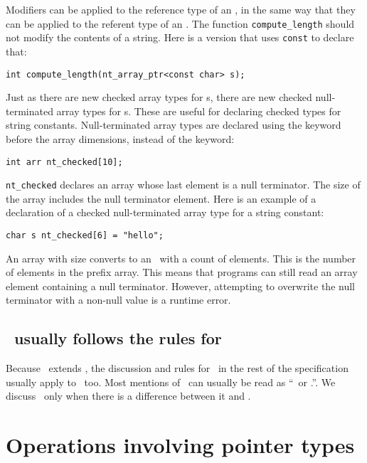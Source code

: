 Modifiers can be applied to the reference type of
an \ntarrayptr, in the same way that they can be applied to the
referent type of an \arrayptr.
The function \verb+compute_length+
should not modify the contents of a string. Here
is a version that uses \verb+const+ to declare that:
\begin{verbatim}
int compute_length(nt_array_ptr<const char> s);
\end{verbatim}

Just as there are new checked array types for \arrayptr s,
there are new checked null-terminated array types for \ntarrayptr s.
These are useful for declaring  checked types for string constants.
Null-terminated array types are declared using the
 keyword before the array dimensions,
instead of the  keyword:
\begin{verbatim}
int arr nt_checked[10];
\end{verbatim}
\verb+nt_checked+ declares an array whose
last element is a null terminator.  The size of the
array includes the null terminator element.
Here is an example of a declaration of a checked null-terminated
array type for a string constant:
\begin{verbatim}
char s nt_checked[6] = "hello";
\end{verbatim}

An  array with size  converts
to an \ntarrayptr\ with a count of  elements.
This is the number of elements in the prefix array.   This means that
programs can still read an array element containing a null terminator.
However, attempting to overwrite the null terminator with a non-null
value is a runtime error.

\subsection{\ntarrayptr\ usually follows the rules for \arrayptr}
Because \ntarrayptr\ extends \arrayptr, the discussion and rules for
\arrayptr\ in the rest of the specification usually apply to \ntarrayptr\
too.  Most mentions of \arrayptr\ can usually be read as
``\arrayptr\ or \ntarrayptr.''.  We discuss \ntarrayptr\ only when
there is a difference between it and \arrayptr.

\section{Operations involving pointer types}

